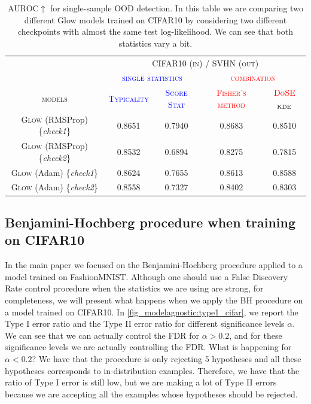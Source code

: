 {\begin{table}[tb]
    \centering
    \caption{AUROC$\uparrow$ for single-sample OOD detection. In this table we are comparing two different Glow models trained on CIFAR10 by considering two different checkpoints with almost the same test log-likelihood. We can see that both statistics vary a bit. }
        \scriptsize
        \begin{tabular}{ccccc}
            \toprule
            &\multicolumn{4}{c}{\textsc{CIFAR10 (in) / SVHN (out)}}\\
            \cmidrule{2-5}
            & \multicolumn{2}{c}{\textcolor{blue}{\textsc{single statistics}}} & \multicolumn{2}{c}{\textcolor{red}{\textsc{combination}}}\\
            \cmidrule(r){2-3}\cmidrule(l){4-5}
            \textsc{models}  &  \textcolor{blue}{\textsc{Typicality}} & \textcolor{blue}{\textsc{Score Stat}} & \textcolor{red}{\textsc{Fisher's method}} & \textcolor{red}{\textsc{DoSE$_{\textup{KDE}}$}} \\
            \midrule
            \textsc{Glow} (RMSProp) \{\emph{check1}\} & 0.8651 &  0.7940  &  0.8683 &  0.8510\\
            \textsc{Glow} (RMSProp) \{\emph{check2}\} & 0.8532 &  0.6894  & 0.8275 & 0.7815\\
            \midrule
            \textsc{Glow} (Adam)  \{\emph{check1}\} & 0.8624 &  0.7655 & 0.8613 & 0.8588\\
            \textsc{Glow} (Adam) \{\emph{check2}\} & 0.8558 & 0.7327 & 0.8402 & 0.8303\\
            \bottomrule
        \end{tabular}
        \label{tab_modelagnostic:variability}
    \vspace*{-\baselineskip}
\end{table}



\subsection{Benjamini-Hochberg procedure when training on CIFAR10}
\label{appendix_modelagnostic:BH_cifar}
In the main paper we focused on the Benjamini-Hochberg procedure applied to a model trained on FashionMNIST. Although one should use a False Discovery Rate control procedure when the statistics we are using are strong, for completeness, we will present what happens when we apply the BH procedure on a model trained on CIFAR10. In \cref{fig_modelagnostic:type1_cifar}, we report the Type I error ratio and the Type II error ratio for different significance levels $\alpha$. We can see that we can actually control the FDR for $\alpha > 0.2$, and for these significance levels we are actually controlling the FDR. What is happening for $\alpha < 0.2$? We have that the procedure is only rejecting 5 hypotheses and all these hypotheses corresponds to in-distribution examples. Therefore, we have that the ratio of Type I error is still low, but we are making a lot of Type II errors because we are accepting all the examples whose hypotheses should be rejected.

}
